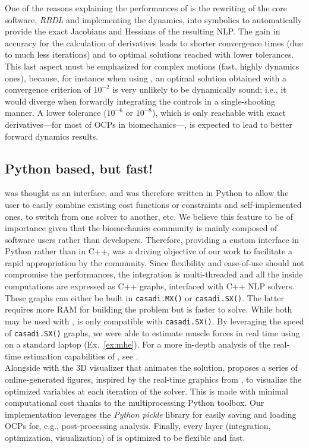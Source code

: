 One of the reasons explaining the performances of \bioptim is the rewriting of the core software, \textit{RBDL} \cite{felis2016rbdl} and \biorbd implementing the dynamics, into \casadi symbolics to automatically provide the exact Jacobians and Hessians of the resulting NLP.  
The gain in accuracy for the calculation of derivatives leads to shorter convergence times (due to much less iterations) and to optimal solutions reached with lower tolerances.
This last aspect must be emphasized for complex motions (fast, highly dynamics ones), because, for instance when using \ipopt, an optimal solution obtained with a convergence criterion of $10^{-2}$ is very unlikely to be dynamically sound; 
i.e., it would diverge when forwardly integrating the controls in a single-shooting manner. 
A lower tolerance ($10^{-6}$ or $10^{-8}$), which is only reachable with exact derivatives---for most of OCPs in biomechanics---, is expected to lead to better forward dynamics results.

\subsection{Python based, but fast!}

\bioptim was thought as an interface, and was therefore written in Python to allow the user to easily combine existing cost functions or constraints and self-implemented ones, to switch from one solver to another, etc. 
We believe this feature to be of importance given that the biomechanics community is mainly composed of software users rather than developers.
Therefore, providing a custom interface in Python rather than in C++, was a driving objective of our work to facilitate a rapid appropriation by the community.
Since flexibility and ease-of-use should not compromise the performances, the integration is multi-threaded and all the inside computations are expressed as C++ \casadi graphs, interfaced with C++ NLP solvers.
These graphs can either be built in \texttt{casadi.MX()} or \texttt{casadi.SX()}.
The latter requires more RAM for building the problem but is faster to solve.
While both may be used with \ipopt, \acados is only compatible with \texttt{casadi.SX()}.
By leveraging the speed of \texttt{casadi.SX()} graphs, we were able to estimate muscle forces in real time using \acados on a standard laptop (Ex.~\ref{ex:mhe}).
For a more in-depth analysis of the real-time estimation capabilities of \bioptim, see \cite{bailly2020real}.\\
Alongside with the 3D visualizer \bioviz that animates the solution, \bioptim proposes a series of online-generated figures, inspired by the  real-time graphics from \muscodii \cite{leineweber2003efficient1, leineweber2003efficient2}, to visualize the optimized variables at each iteration of the solver.
This is made with minimal computational cost thanks to the multiprocessing Python toolbox. 
Our implementation leverages the \textit{Python pickle} library for easily saving and loading OCPs for, e.g., post-processing analysis.
Finally, every layer (integration, optimization, visualization) of \bioptim is optimized to be flexible and fast.

